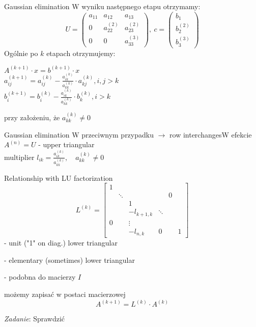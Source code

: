 \begin{frame}{Gaussian elimination}
W wyniku następnego etapu otrzymamy:
$$
U = \left(\begin{array}{lll}
a_{11} & a_{12} & a_{13}\\
0 & a_{22}^{(2)} &a_{23}^{(2)}\\
0 & 0 & a_{33}^{(3)}
\end{array}\right)
,\ c=\left(\begin{array}{l}
b_{1}\\
b_{2}^{(2)}\\
b_{3}^{(3)}
\end{array}\right)
$$
Ogólnie po $k$ etapach otrzymujemy:
\begin{flushright}
$
A^{(k+1)}\cdot x=b^{(k+1)}\cdot x
$
$$
$$
$a_{ij}^{(k+1)}=a_{ij}^{(k)}-\displaystyle \frac{a_{ik}^{(k)}}{a_{kk}^{(k)}}\cdot a_{kj}^{(k)}, i, j>k$ 
$$
$$
$b_{i}^{(k+1)}=b_{i}^{(k)}-\displaystyle \frac{a_{ik}^{(k)}}{a_{kk}^{(k)}}\cdot b_{k}^{(k)}, i>k$ 
\end{flushright}
przy założeniu, że $a_{kk}^{(k)}\neq 0$

\end{frame}
\begin{frame}{Gaussian elimination}
W przeciwnym przypadku $\rightarrow$ row interchanges\newline W efekcie $A^{(n)}=U$ - upper triangular \\
multiplier $l_{ik}=\displaystyle \frac{a_{ik}^{(k)}}{a_{kk}^{(k)}}, \quad a_{kk}^{(k)}\neq 0 $
\end{frame}
\begin{frame}{Relationship with LU factorization}
$$
L^{(k)}=\begin{bmatrix}
1 \\
 & \ddots & & & 0 \\
 & & 1\\
 & &   -l_{k+1,k}  & \ddots\\
 0 & &  \vdots &\\
 & & -l_{n,k} &  0  & & 1

\end{bmatrix}
$$
- unit ("1" on diag.) lower triangular

- elementary (sometimes) lower triangular

- podobna do macierzy $I$

 możemy zapisać w postaci macierzowej
$$
A^{(k+1)}=L^{(k)}\cdot A^{(k)}
$$
\begin{flushright}
{\it Zadanie}: Sprawdzić
\end{flushright}


\end{frame}
